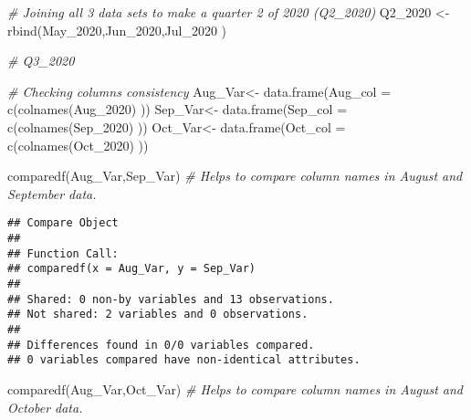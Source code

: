 \documentclass[
]{article}
\newenvironment{Shaded}{\begin{snugshade}}{\end{snugshade}}
\newcommand{\AttributeTok}[1]{\textcolor[rgb]{0.77,0.63,0.00}{#1}}
\newcommand{\CommentTok}[1]{\textcolor[rgb]{0.56,0.35,0.01}{\textit{#1}}}
\newcommand{\FunctionTok}[1]{\textcolor[rgb]{0.00,0.00,0.00}{#1}}
\newcommand{\NormalTok}[1]{#1}
\newcommand{\OtherTok}[1]{\textcolor[rgb]{0.56,0.35,0.01}{#1}}
\begin{document}
\begin{Shaded}
\begin{Highlighting}[]
\CommentTok{\# Joining all 3 data sets to make a quarter 2 of 2020 (Q2\_2020)}
\NormalTok{  Q2\_2020 }\OtherTok{\textless{}{-}} \FunctionTok{rbind}\NormalTok{(May\_2020,Jun\_2020,Jul\_2020 )}
\end{Highlighting}
\end{Shaded}

\begin{Shaded}
\begin{Highlighting}[]
\CommentTok{\# Q3\_2020 }
\end{Highlighting}
\end{Shaded}

\begin{Shaded}
\begin{Highlighting}[]
\CommentTok{\# Checking columns consistency }
\NormalTok{ Aug\_Var}\OtherTok{\textless{}{-}} \FunctionTok{data.frame}\NormalTok{(}\AttributeTok{Aug\_col =}  \FunctionTok{c}\NormalTok{(}\FunctionTok{colnames}\NormalTok{(Aug\_2020) ))}
\NormalTok{ Sep\_Var}\OtherTok{\textless{}{-}} \FunctionTok{data.frame}\NormalTok{(}\AttributeTok{Sep\_col =}  \FunctionTok{c}\NormalTok{(}\FunctionTok{colnames}\NormalTok{(Sep\_2020) ))}
\NormalTok{ Oct\_Var}\OtherTok{\textless{}{-}} \FunctionTok{data.frame}\NormalTok{(}\AttributeTok{Oct\_col =}  \FunctionTok{c}\NormalTok{(}\FunctionTok{colnames}\NormalTok{(Oct\_2020) ))}
 
 \FunctionTok{comparedf}\NormalTok{(Aug\_Var,Sep\_Var) }\CommentTok{\# Helps to compare column names in August and September data.}
\end{Highlighting}
\end{Shaded}

\begin{verbatim}
## Compare Object
## 
## Function Call: 
## comparedf(x = Aug_Var, y = Sep_Var)
## 
## Shared: 0 non-by variables and 13 observations.
## Not shared: 2 variables and 0 observations.
## 
## Differences found in 0/0 variables compared.
## 0 variables compared have non-identical attributes.
\end{verbatim}

\begin{Shaded}
\begin{Highlighting}[]
 \FunctionTok{comparedf}\NormalTok{(Aug\_Var,Oct\_Var) }\CommentTok{\# Helps to compare column names in August and October data.}
\end{Highlighting}
\end{Shaded}
\end{document}
